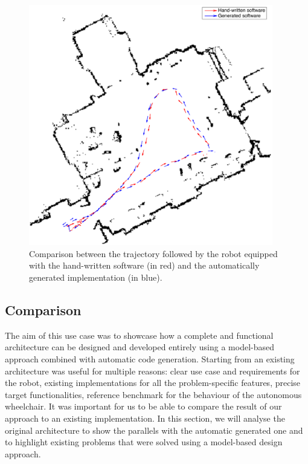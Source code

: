 \begin{figure}[t]
\centering
\includegraphics[width=0.95\textwidth]{gfx/pmk/path-followed}
\caption{Comparison between the trajectory followed by the robot equipped with the hand-written software (in red) and the automatically generated implementation (in blue).}
\label{fig:path}
\end{figure}

\subsection{Comparison}
The aim of this use case was to showcase how a complete and functional architecture can be designed and developed entirely using a model-based approach combined with automatic code generation. Starting from an existing architecture was useful for multiple reasons: clear use case and requirements for the robot, existing implementations for all the problem-specific features, precise target functionalities, reference benchmark for the behaviour of the autonomous wheelchair. It was important for us to be able to compare the result of our approach to an existing implementation. In this section, we will analyse the original architecture to show the parallels with the automatic generated one and to highlight existing problems that were solved using a model-based design approach.

